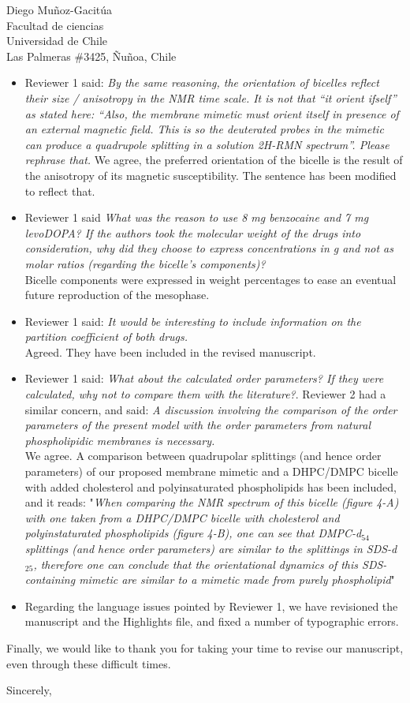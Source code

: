 \documentclass{letter}
\begin{document}
\begin{letter}{Diego Muñoz-Gacitúa\\ Facultad de ciencias \\ Universidad de
    Chile \\ Las Palmeras \#3425, Ñuñoa, Chile}
\begin{itemize}
\item Reviewer 1 said: \textit{By the same reasoning, the orientation of bicelles reflect their size / anisotropy in the NMR time scale. It is not that “it orient ifself” as stated here: “Also, the membrane mimetic must orient itself in presence of an external magnetic field. This is so the deuterated probes in the mimetic can produce a quadrupole splitting in a solution 2H-RMN spectrum”. Please rephrase that.}
We agree, the preferred orientation of the bicelle is the result of the anisotropy of its magnetic susceptibility. The sentence has been modified to reflect that.

\item Reviewer 1 said \textit{What was the reason to use 8 mg benzocaine and 7 mg levoDOPA? If the authors took the molecular weight of the drugs into consideration, why did they choose to express concentrations in g and not as molar ratios (regarding the bicelle’s components)?}\\
Bicelle components were expressed in weight percentages to ease an eventual future reproduction of the mesophase.
\item Reviewer 1 said: \textit{It would be interesting to include information on the partition coefficient of both drugs.}\\
  Agreed. They have been included in the revised manuscript.
  
  \item Reviewer 1 said: \textit{What about the calculated order parameters? If they were calculated, why not to compare them with the literature?}. Reviewer 2 had a similar concern, and said: \textit{A discussion involving the comparison of the order parameters of the present model with the order parameters from natural phospholipidic membranes is necessary.}\\
  We agree. A comparison between quadrupolar splittings (and hence order parameters) of our proposed membrane mimetic and a DHPC/DMPC bicelle with added cholesterol and polyinsaturated phospholipids has been included, and it reads: "\textit{When comparing the NMR spectrum of this bicelle (figure 4-A) with one taken from a DHPC/DMPC bicelle with cholesterol and polyinstaturated phospholipids (figure 4-B), one can see that DMPC-d$_{54}$ splittings (and hence order parameters) are similar to the splittings in SDS-d$_{25}$, therefore one can conclude that the orientational dynamics of this SDS-containing mimetic are similar to a mimetic made from purely phospholipid}"
  
	\item Regarding the language issues pointed by Reviewer 1, we have revisioned the manuscript and the Highlights file, and fixed a number of typographic errors.
 \end{itemize}

   Finally, we would like to thank you for taking your time to revise our
   manuscript, even through these difficult times.

   \closing{Sincerely,}

 \end{letter}
 
\end{document}
